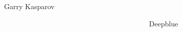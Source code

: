 \documentclass[notes,12pt, aspectratio=169]{beamer}
\begin{document}
\begin{frame}
\begin{columns}[T]
\begin{column}{.49\textwidth}
		\hspace{1.9cm} Garry Kasparov
	\end{column}
	\hfill
	\begin{column}{.49\textwidth}
	\hspace{1.5cm}
	\mbox{ }
	
	\hspace{2.5cm} Deepblue
	\end{column}
\end{columns}
\end{frame}
\end{document}
